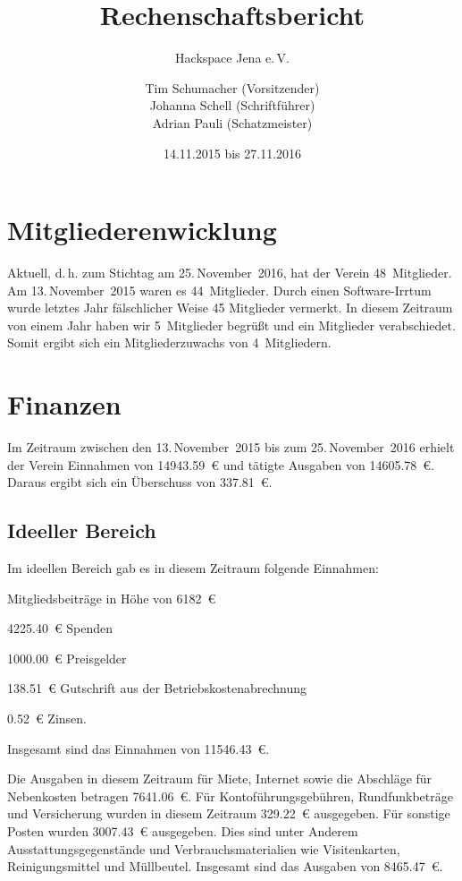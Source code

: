 \documentclass[ngerman]{scrartcl}
\title{Rechenschaftsbericht}
\subtitle{Hackspace Jena e.\,V.}
\author{%
	Tim Schumacher (Vorsitzender)\\
	Johanna Schell (Schriftführer)\\
	Adrian Pauli (Schatzmeister)
}
\date{14.11.2015 bis 27.11.2016}
\begin{document}
\maketitle{}

\tableofcontents{}

\newpage{}

\section{Mitgliederenwicklung}

Aktuell, d.\,h. zum Stichtag am 25.\,November~2016, hat der Verein 48~Mitglieder. Am 13.\,November~2015 waren es 44~Mitglieder. Durch einen Software-Irrtum wurde letztes Jahr fälschlicher Weise 45 Mitglieder vermerkt. In diesem Zeitraum von einem Jahr haben wir 5~Mitglieder begrüßt und ein Mitglieder verabschiedet. Somit ergibt sich ein Mitgliederzuwachs von 4~Mitgliedern.

\section{Finanzen}

Im  Zeitraum zwischen den 13.\,November~2015 bis zum 25.\,November~2016 erhielt der Verein Einnahmen von \num{14943,59}~\euro{} und tätigte Ausgaben von \num{14605,78}~\euro{}.
Daraus ergibt sich ein Überschuss von \num{337,81}~\euro{}.

\subsection{Ideeller Bereich}
\label{sec:ideeller_bereich}

Im ideellen Bereich gab es in diesem Zeitraum folgende Einnahmen:
\begin{compactitem}
\item Mitgliedsbeiträge in Höhe von \num{6182}~\euro{}
\item \num{4225,40}~\euro{} Spenden
\item \num{1000,00}~\euro{} Preisgelder
\item \num{138,51}~\euro{} Gutschrift aus der Betriebskostenabrechnung
\item \num{0,52}~\euro{} Zinsen.
\end{compactitem}
Insgesamt sind das Einnahmen von \num{11546,43}~\euro{}.

Die Ausgaben in diesem Zeitraum für Miete, Internet sowie die Abschläge für Nebenkosten betragen \num{7641,06}~\euro{}.
Für Kontoführungsgebühren, Rundfunkbeträge und Versicherung wurden in diesem Zeitraum \num{329,22}~\euro{} ausgegeben.
Für sonstige Posten wurden \num{3007,43}~\euro{} ausgegeben. Dies sind unter Anderem Ausstattungsgegenstände und Verbrauchsmaterialien wie Visitenkarten, Reinigungsmittel und Müllbeutel.
Insgesamt sind das Ausgaben von \num{8465,47}~\euro{}.
\end{document}
